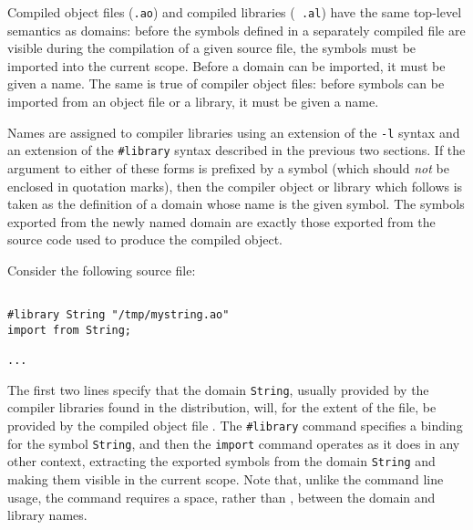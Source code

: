 
Compiled object files ({\tt .ao}) and compiled libraries ({\tt
.al}) have the same top-level semantics as \asharp{} domains:
before the symbols defined in a separately compiled file are
visible during the compilation of a given source file, the symbols
must be imported into the current scope.
Before a domain can be imported, it must be given a name.
The same is true of compiler object files: before symbols can be
imported from an object file or a library, it must be given a name.

Names are assigned to compiler libraries using an extension of the
{\tt -l} syntax and an extension of the {\tt \#library} syntax
described in the previous two sections.
If the argument to either of these forms is prefixed by a symbol
(which should {\it not} be enclosed in quotation marks), then the
compiler object or library which follows is taken as the
definition of a domain whose name is the given symbol.
The symbols exported from the newly named domain are exactly those
exported from the source code used to produce the compiled object.

Consider the following \asharp{} source file:

\begin{verbatim}

#library String "/tmp/mystring.ao"
import from String;

...

\end{verbatim}

The first two lines specify that the domain {\tt String},
usually provided by the compiler libraries found in the
distribution, will, for the extent of the file, be provided by the
compiled object file .
The {\tt \#library} command specifies a binding for the symbol
{\tt String}, and then the {\tt import} command operates as it does
in any other context, extracting the exported symbols from the
domain {\tt String} and making them visible in the current scope.%
  Note that, unlike the command line
usage, the  command requires a space, rather than
\ttin{=}, between the domain and library names.

